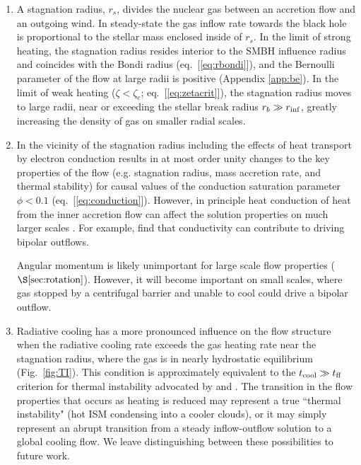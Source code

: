 \documentclass[usenatbib,fleqn]{mn2e}
\newcommand{\rs}{r_s}
\begin{document}
  \begin{enumerate}
  \item A stagnation radius, $\rs$, divides the nuclear gas between an
    accretion flow and an outgoing wind. In steady-state the gas inflow
    rate towards the black hole is proportional to the stellar mass
    enclosed inside of $\rs$.  In the limit of strong heating, the
    stagnation radius resides interior to the SMBH influence radius
    and coincides with the Bondi radius (eq.~[\ref{eq:rbondi}]), and
    the Bernoulli parameter of the flow at large radii is positive
    (Appendix \ref{app:be}).  In the limit of weak heating ($\zeta <
    \zeta_c$; eq.~[\ref{eq:zetacrit}]), the stagnation radius moves to
    large radii, near or exceeding the stellar break radius $r_b \gg
    r_{\rm inf}$, greatly increasing the density of gas on smaller
    radial scales.

  \item In the vicinity of the stagnation radius including the effects
    of heat transport by electron conduction results in at most order
    unity changes to the key properties of the flow (e.g. stagnation
    radius, mass accretion rate, and thermal stability) for causal
    values of the conduction saturation parameter $\phi < 0.1$
    (eq.~[\ref{eq:conduction}]). However, in principle heat conduction
    of heat from the inner accretion flow can affect the solution
    properties on much larger scales \citep{Johnson+2007}. For
    example, \citet{Tanaka+2006} find that conductivity can contribute
    to driving bipolar outflows.

    Angular momentum is likely unimportant for large scale flow
    properties ($\S\ref{sec:rotation}$). However, it will become
    important on small scales, where gas stopped by a centrifugal
    barrier and unable to cool could drive a bipolar outflow.

  \item Radiative cooling has a more pronounced influence on the flow
    structure when the radiative cooling rate exceeds the gas heating
    rate near the stagnation radius, where the gas is in nearly
    hydrostatic equilibrium (Fig.~\ref{fig:TI}).  This condition is
    approximately equivalent to the $t_{\rm cool} \gg t_{\rm ff}$
    criterion for thermal instability advocated by \citet{McCourt+12}
    and \citet{Li&Bryan14a}.  The transition in the flow properties
    that occurs as heating is reduced may represent a true ``thermal
    instability" (hot ISM condensing into a cooler clouds), or it may
    simply represent an abrupt transition from a steady inflow-outflow
    solution to a global cooling flow.  We leave distinguishing
    between these possibilities to future work.


\end{enumerate}
\end{document}
